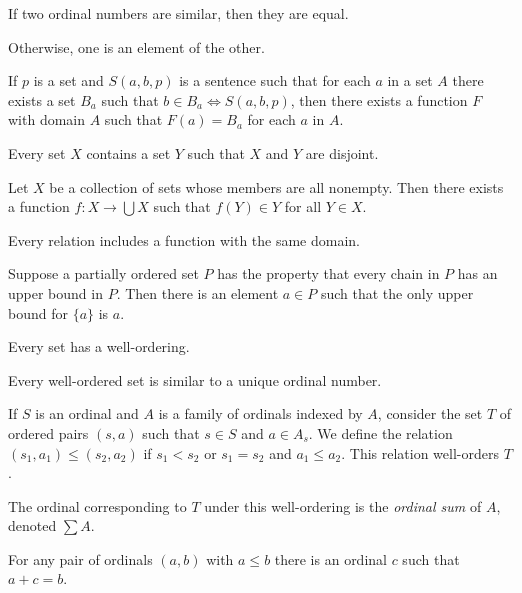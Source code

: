 \begin{thm}
  If two ordinal numbers are similar, then they are equal.

  Otherwise, one is an element of the other.
\end{thm}
\begin{axiom}[Substitution]
  If $p$ is a set and 
  $S(a,b,p)$ is a sentence such that for each $a$ in a set $A$ there exists a
  set $B_a$ such that $b\in B_a\iff S(a,b,p)$, then there exists a function $F$
  with domain $A$ such that $F(a)=B_a$ for each $a$ in $A$.
\end{axiom}
\begin{axiom}[Foundation]
  Every set $X$ contains a set $Y$ such that $X$ and $Y$ are disjoint.
\end{axiom}
\begin{axiom}[Choice]
  Let $X$ be a collection of sets whose members are all nonempty. Then there exists a
  function $f:X\to\bigcup X$ such that $f(Y)\in Y$ for all $Y\in X$.
\end{axiom}
\begin{prop}
  Every relation includes a function with the same domain.
\end{prop}
\begin{thm}
  Suppose a partially ordered set $P$ has the property that every chain in $P$
  has an upper bound in $P$. Then there is an element $a\in P$ such that the
  only upper bound for $\{a\}$ is $a$.
\end{thm}
\begin{thm}
  Every set has a well-ordering.
\end{thm}
\begin{prop}
  Every well-ordered set is similar to a unique ordinal number.
\end{prop}
\begin{prop}
    If $S$ is an ordinal and $A$ is a family of ordinals indexed by $A$,
    consider the set $T$ of ordered pairs $(s,a)$ such that $s\in S$ and $a\in
    A_s$. We define the relation $(s_1,a_1)\le(s_2,a_2)$ if $s_1<s_2$
    or $s_1=s_2$ and $a_1\le a_2$. This relation well-orders $T$.
\end{prop}
\begin{defn}
  The ordinal corresponding to $T$ under this well-ordering is the
  \emph{ordinal sum} of $A$, denoted $\sum A$.
\end{defn}
\begin{prop}
    For any pair of ordinals $(a,b)$ with $a\le b$ there is an ordinal $c$ such
    that $a+c=b$.
\end{prop}
